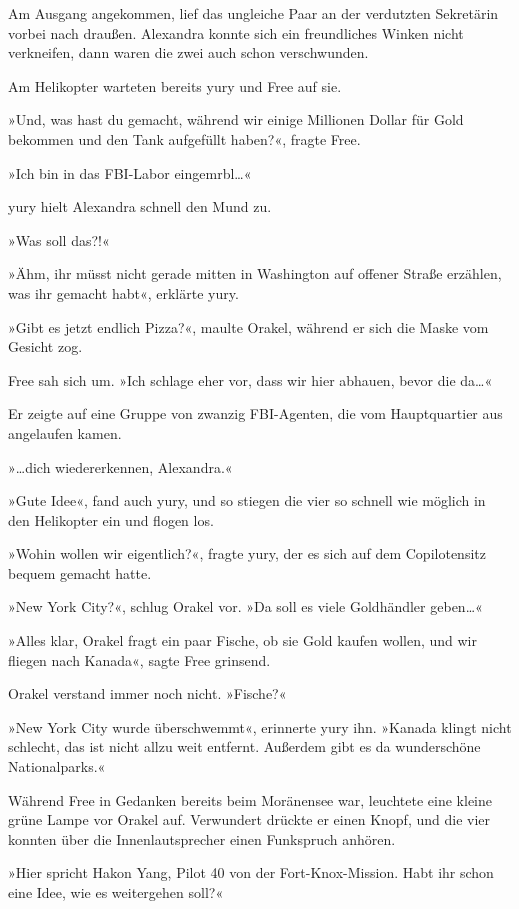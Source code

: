 Am Ausgang angekommen, lief das ungleiche Paar an der verdutzten Sekretärin vorbei nach draußen. Alexandra konnte sich ein freundliches Winken nicht verkneifen, dann waren die zwei auch schon verschwunden.

Am Helikopter warteten bereits yury und Free auf sie.

»Und, was hast du gemacht, während wir einige Millionen Dollar für Gold bekommen und den Tank aufgefüllt haben?«, fragte Free.

»Ich bin in das FBI-Labor eingemrbl…«

yury hielt Alexandra schnell den Mund zu.

»Was soll das?!«

»Ähm, ihr müsst nicht gerade mitten in Washington auf offener Straße erzählen, was ihr gemacht habt«, erklärte yury.

»Gibt es jetzt endlich Pizza?«, maulte Orakel, während er sich die Maske vom Gesicht zog.

Free sah sich um. »Ich schlage eher vor, dass wir hier abhauen, bevor die da…«

Er zeigte auf eine Gruppe von zwanzig FBI-Agenten, die vom Hauptquartier aus angelaufen kamen.

»…dich wiedererkennen, Alexandra.«

»Gute Idee«, fand auch yury, und so stiegen die vier so schnell wie möglich in den Helikopter ein und flogen los.

»Wohin wollen wir eigentlich?«, fragte yury, der es sich auf dem Copilotensitz bequem gemacht hatte.

»New York City?«, schlug Orakel vor. »Da soll es viele Goldhändler geben…«

»Alles klar, Orakel fragt ein paar Fische, ob sie Gold kaufen wollen, und wir fliegen nach Kanada«, sagte Free grinsend.

Orakel verstand immer noch nicht. »Fische?«

»New York City wurde überschwemmt«, erinnerte yury ihn. »Kanada klingt nicht schlecht, das ist nicht allzu weit entfernt. Außerdem gibt es da wunderschöne Nationalparks.«

Während Free in Gedanken bereits beim Moränensee war, leuchtete eine kleine grüne Lampe vor Orakel auf. Verwundert drückte er einen Knopf, und die vier konnten über die Innenlautsprecher einen Funkspruch anhören.

»Hier spricht Hakon Yang, Pilot 40 von der Fort-Knox-Mission. Habt ihr schon eine Idee, wie es weitergehen soll?«

